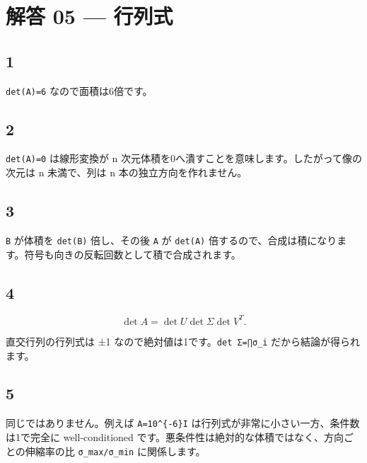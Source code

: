 \documentclass[
  11pt,
  a4paper,
]{ltjsarticle}
\author{}
\date{}
\begin{document}
\hypertarget{ux89e3ux7b54-05-ux884cux5217ux5f0f}{%
\section{解答 05 --- 行列式}\label{ux89e3ux7b54-05-ux884cux5217ux5f0f}}

\hypertarget{section}{%
\subsection{1}\label{section}}

\texttt{det(A)=6} なので面積は6倍です。

\hypertarget{section-1}{%
\subsection{2}\label{section-1}}

\texttt{det(A)=0} は線形変換が n
次元体積を0へ潰すことを意味します。したがって像の次元は n 未満で、列は n
本の独立方向を作れません。

\hypertarget{section-2}{%
\subsection{3}\label{section-2}}

\texttt{B} が体積を \texttt{det(B)} 倍し、その後 \texttt{A} が
\texttt{det(A)}
倍するので、合成は積になります。符号も向きの反転回数として積で合成されます。

\hypertarget{section-3}{%
\subsection{4}\label{section-3}}

\[
\det A=\det U\det\Sigma\det V^T.
\]

直交行列の行列式は ±1 なので絶対値は1です。\texttt{det\ Σ=∏σ\_i}
だから結論が得られます。

\hypertarget{section-4}{%
\subsection{5}\label{section-4}}

同じではありません。例えば \texttt{A=10\^{}\{-6\}I}
は行列式が非常に小さい一方、条件数は1で完全に well-conditioned
です。悪条件性は絶対的な体積ではなく、方向ごとの伸縮率の比
\texttt{σ\_max/σ\_min} に関係します。
\end{document}
